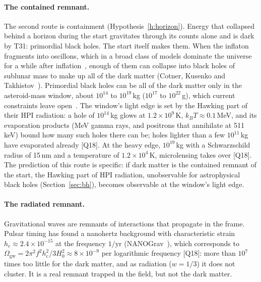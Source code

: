 \documentclass[11pt,a4paper]{article}
\theoremstyle{definition}
\theoremstyle{remark}
\newcommand{\chk}[1]{\textsf{[#1]}}
\theoremstyle{definition}
\begin{document}
\paragraph{The contained remnant.} The second route is containment (Hypothesis~\ref{h:horizon}). Energy that collapsed behind a horizon
during the start gravitates through its counts alone and is dark by T31: primordial black holes. The start itself makes them. When the
inflaton fragments into oscillons, which in a broad class of models dominate the universe for a while after inflation~\cite{amin}, enough
of them can collapse into black holes of sublunar mass to make up all of the dark matter (Cotner, Kusenko and Takhistov~\cite{cotner}).
Primordial black holes can be all of the dark matter only in the asteroid-mass window, about $10^{14}$ to $10^{19}$\,kg ($10^{17}$ to
$10^{22}$\,g), which current constraints leave open~\cite{gortongreen}. The window's light edge is set by the Hawking part of their HPI
radiation: a hole of $10^{14}$\,kg glows at $1.2\times10^9$\,K, $k_BT\approx0.1$\,MeV, and its evaporation products (MeV gamma rays, and
positrons that annihilate at 511\,keV) bound how many such holes there can be; holes lighter than a few $10^{11}$\,kg have evaporated
already \chk{Q18}. At the heavy edge, $10^{19}$\,kg with a Schwarzschild radius of 15\,nm and a temperature of $1.2\times10^4$\,K,
microlensing takes over \chk{Q18}. The prediction of this route is specific: if dark matter is the contained remnant of the start, the
Hawking part of HPI radiation, unobservable for astrophysical black holes (Section~\ref{sec:bh}), becomes observable at the window's light
edge.

\paragraph{The radiated remnant.} Gravitational waves are remnants of interactions that propagate in the frame. Pulsar timing has found a
nanohertz background with characteristic strain $h_c\approx2.4\times10^{-15}$ at the frequency $1/\text{yr}$ (NANOGrav~\cite{nanograv}),
which corresponds to $\Omega_{\text{gw}}=2\pi^2f^2h_c^2/3H_0^2\approx8\times10^{-9}$ per logarithmic frequency \chk{Q18}: more than $10^7$
times too little for the dark matter, and as radiation ($w=1/3$) it does not cluster. It is a real remnant trapped in the field, but not
the dark matter.
\end{document}
